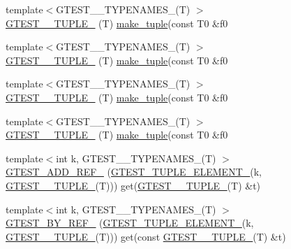 \begin{DoxyCompactItemize}
\item 
{\footnotesize template$<$G\+T\+E\+S\+T\+\_\+\_\+\+T\+Y\+P\+E\+N\+A\+M\+E\+S\+\_\+(\+T) $>$ }\\\hyperlink{namespacestd_1_1tr1_a61277f5af24b20fce87a9fd94307ab34}{G\+T\+E\+S\+T\+\_\+\_\+\+T\+U\+P\+L\+E\+\_\+} (T) \hyperlink{namespacestd_1_1tr1_af7e12a0f5b5791b5b7c49a5a17b85359}{make\+\_\+tuple}(const T0 \&f0
\item 
{\footnotesize template$<$G\+T\+E\+S\+T\+\_\+\_\+\+T\+Y\+P\+E\+N\+A\+M\+E\+S\+\_\+(\+T) $>$ }\\\hyperlink{namespacestd_1_1tr1_a29c8efcb79a4749e079b704c418266e6}{G\+T\+E\+S\+T\+\_\+\_\+\+T\+U\+P\+L\+E\+\_\+} (T) \hyperlink{namespacestd_1_1tr1_af7e12a0f5b5791b5b7c49a5a17b85359}{make\+\_\+tuple}(const T0 \&f0
\item 
{\footnotesize template$<$G\+T\+E\+S\+T\+\_\+\_\+\+T\+Y\+P\+E\+N\+A\+M\+E\+S\+\_\+(\+T) $>$ }\\\hyperlink{namespacestd_1_1tr1_a6afad1f98814ccc897d0b02bc6fc4e7d}{G\+T\+E\+S\+T\+\_\+\_\+\+T\+U\+P\+L\+E\+\_\+} (T) \hyperlink{namespacestd_1_1tr1_af7e12a0f5b5791b5b7c49a5a17b85359}{make\+\_\+tuple}(const T0 \&f0
\item 
{\footnotesize template$<$G\+T\+E\+S\+T\+\_\+\_\+\+T\+Y\+P\+E\+N\+A\+M\+E\+S\+\_\+(\+T) $>$ }\\\hyperlink{namespacestd_1_1tr1_aa636d3269bf1f368a7bc09ff158bc482}{G\+T\+E\+S\+T\+\_\+\_\+\+T\+U\+P\+L\+E\+\_\+} (T) \hyperlink{namespacestd_1_1tr1_af7e12a0f5b5791b5b7c49a5a17b85359}{make\+\_\+tuple}(const T0 \&f0
\item 
{\footnotesize template$<$int k, G\+T\+E\+S\+T\+\_\+\_\+\+T\+Y\+P\+E\+N\+A\+M\+E\+S\+\_\+(\+T) $>$ }\\\hyperlink{namespacestd_1_1tr1_a495d7fb7a131317a9ba985598d3c1504}{G\+T\+E\+S\+T\+\_\+\+A\+D\+D\+\_\+\+R\+E\+F\+\_\+} (\hyperlink{gtest-tuple_8h_a1b7f133d8aa02e0b7afed7b66781eeb7}{G\+T\+E\+S\+T\+\_\+\+T\+U\+P\+L\+E\+\_\+\+E\+L\+E\+M\+E\+N\+T\+\_\+}(k, \hyperlink{namespacestd_1_1tr1_aa636d3269bf1f368a7bc09ff158bc482}{G\+T\+E\+S\+T\+\_\+\_\+\+T\+U\+P\+L\+E\+\_\+}(T))) get(\hyperlink{namespacestd_1_1tr1_aa636d3269bf1f368a7bc09ff158bc482}{G\+T\+E\+S\+T\+\_\+\_\+\+T\+U\+P\+L\+E\+\_\+}(T) \&t)
\item 
{\footnotesize template$<$int k, G\+T\+E\+S\+T\+\_\+\_\+\+T\+Y\+P\+E\+N\+A\+M\+E\+S\+\_\+(\+T) $>$ }\\\hyperlink{namespacestd_1_1tr1_ae7b5ea477ac34a3eef5c4c15c42b76ed}{G\+T\+E\+S\+T\+\_\+\+B\+Y\+\_\+\+R\+E\+F\+\_\+} (\hyperlink{gtest-tuple_8h_a1b7f133d8aa02e0b7afed7b66781eeb7}{G\+T\+E\+S\+T\+\_\+\+T\+U\+P\+L\+E\+\_\+\+E\+L\+E\+M\+E\+N\+T\+\_\+}(k, \hyperlink{namespacestd_1_1tr1_aa636d3269bf1f368a7bc09ff158bc482}{G\+T\+E\+S\+T\+\_\+\_\+\+T\+U\+P\+L\+E\+\_\+}(T))) get(const \hyperlink{namespacestd_1_1tr1_aa636d3269bf1f368a7bc09ff158bc482}{G\+T\+E\+S\+T\+\_\+\_\+\+T\+U\+P\+L\+E\+\_\+}(T) \&t)

\end{DoxyCompactItemize}
